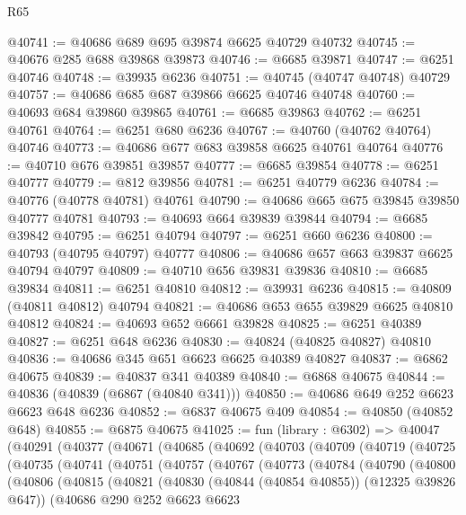 \begin{lexlean}{R65}
\begin{coremodule}
{@40741 := @40686 @689 @695 @39874 @6625 @40729 @40732
@40745 := @40676 @285 @688 @39868 @39873
@40746 := @6685 @39871
@40747 := @6251 @40746
@40748 := @39935 @6236
@40751 := @40745 (@40747 @40748) @40729
@40757 := @40686 @685 @687 @39866 @6625 @40746 @40748
@40760 := @40693 @684 @39860 @39865
@40761 := @6685 @39863
@40762 := @6251 @40761
@40764 := @6251 @680 @6236
@40767 := @40760 (@40762 @40764) @40746
@40773 := @40686 @677 @683 @39858 @6625 @40761 @40764
@40776 := @40710 @676 @39851 @39857
@40777 := @6685 @39854
@40778 := @6251 @40777
@40779 := @812 @39856
@40781 := @6251 @40779 @6236
@40784 := @40776 (@40778 @40781) @40761
@40790 := @40686 @665 @675 @39845 @39850 @40777 @40781
@40793 := @40693 @664 @39839 @39844
@40794 := @6685 @39842
@40795 := @6251 @40794
@40797 := @6251 @660 @6236
@40800 := @40793 (@40795 @40797) @40777
@40806 := @40686 @657 @663 @39837 @6625 @40794 @40797
@40809 := @40710 @656 @39831 @39836
@40810 := @6685 @39834
@40811 := @6251 @40810
@40812 := @39931 @6236
@40815 := @40809 (@40811 @40812) @40794
@40821 := @40686 @653 @655 @39829 @6625 @40810 @40812
@40824 := @40693 @652 @6661 @39828
@40825 := @6251 @40389
@40827 := @6251 @648 @6236
@40830 := @40824 (@40825 @40827) @40810
@40836 := @40686 @345 @651 @6623 @6625 @40389 @40827
@40837 := @6862 @40675
@40839 := @40837 @341 @40389
@40840 := @6868 @40675
@40844 := @40836 (@40839 (@6867 (@40840 @341)))
@40850 := @40686 @649 @252 @6623 @6623 @648 @6236
@40852 := @6837 @40675 @409
@40854 := @40850 (@40852 @648)
@40855 := @6875 @40675
@41025 := fun (library : @6302) =>
  @40047
    (@40291
      (@40377
        (@40671
          (@40685
            (@40692
              (@40703
                (@40709
                  (@40719
                    (@40725
                      (@40735
                        (@40741
                          (@40751
                            (@40757
                              (@40767
                                (@40773
                                  (@40784
                                    (@40790
                                      (@40800
                                        (@40806
                                          (@40815
                                            (@40821
                                              (@40830 (@40844 (@40854 @40855)) (@12325 @39826 @647))
                                              (@40686
                                                @290
                                                @252
                                                @6623
                                                @6623
}
\end{coremodule}
\end{lexlean}
